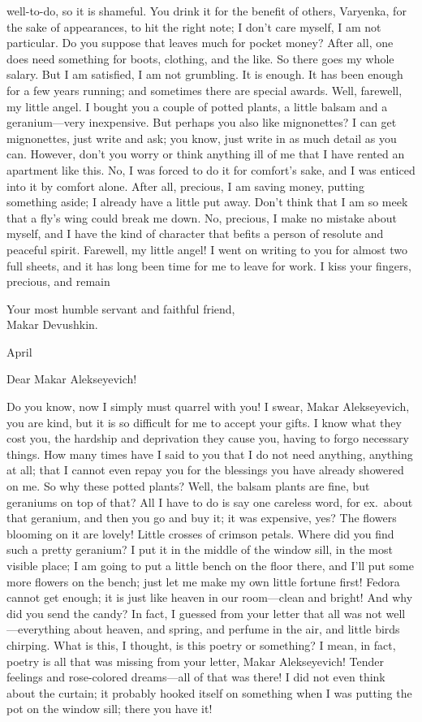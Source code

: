 well-to-do, so it is shameful. You drink it for the benefit of others, Varyenka, for the sake of appearances, to hit the right note; I don't care myself, I am not particular. Do you suppose that leaves much for pocket money? After all, one does need something for boots, clothing, and the like. So there goes my whole salary. But I am satisfied, I am not grumbling. It is enough. It has been enough for a few years running; and sometimes there are special awards. Well, farewell, my little angel. I bought you a couple of potted plants, a little balsam and a geranium---very inexpensive. But perhaps you also like mignonettes? I can get mignonettes, just write and ask; you know, just write in as much detail as you can. However, don't you worry or think anything ill of me that I have rented an apartment like this. No, I was forced to do it for comfort's sake, and I was enticed into it by comfort alone. After all, precious, I am saving money, putting something aside; I already have a little put away. Don't think that I am so meek that a fly's wing could break me down. No, precious, I make no mistake about myself, and I have the kind of character that befits a person of resolute and peaceful spirit. Farewell, my little angel! I went on writing to you for almost two full sheets, and it has long been time for me to leave for work. I kiss your fingers, precious, and remain

Your most humble servant and faithful friend,\\
	Makar Devushkin.

\begin{flushright}
	April 
\end{flushright}

Dear Makar Alekseyevich!

Do you know, now I simply must quarrel with you! I swear, Makar Alekseyevich, you are kind, but it is so difficult for me to accept your gifts. I know what they cost you, the hardship and deprivation they cause you, having to forgo necessary things. How many times have I said to you that I do not need anything, anything at all; that I cannot even repay you for the blessings you have already showered on me. So why these potted plants? Well, the balsam plants are fine, but geraniums on top of that? All I have to do is say one careless word, for ex.~about that geranium, and then you go and buy it; it was expensive, yes? The flowers blooming on it are lovely! Little crosses of crimson petals. Where did you find such a pretty geranium? I put it in the middle of the window sill, in the most visible place; I am going to put a little bench on the floor there, and I'll put some more flowers on the bench; just let me make my own little fortune first! Fedora cannot get enough; it is just like heaven in our room---clean and bright! And why did you send the candy? In fact, I guessed from your letter that all was not well---everything about heaven, and spring, and perfume in the air, and little birds chirping. What is this, I thought, is this poetry or something? I mean, in fact, poetry is all that was missing from your letter, Makar Alekseyevich! Tender feelings and rose-colored dreams---all of that was there! I did not even think about the curtain; it probably hooked itself on something when I was putting the pot on the window sill; there you have it!
